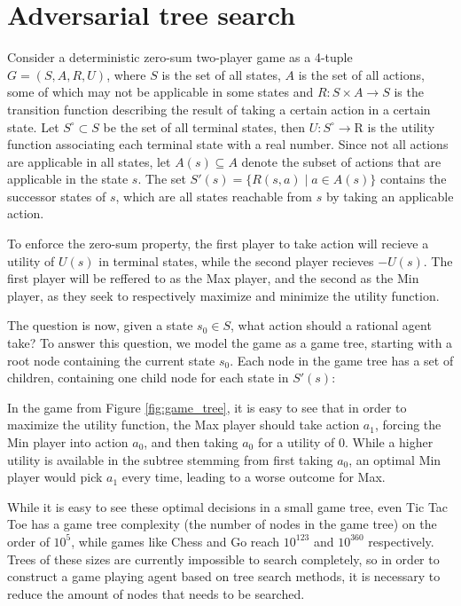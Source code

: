 \section{Adversarial tree search}
\label{sec:theory}

Consider a deterministic zero-sum two-player game as a 4-tuple 
$G = (S, A, R, U)$, where $S$ is the set of all states, $A$ is the
set of all actions, some of which may not be applicable in some
states and $R: S \times A \rightarrow S$ is the transition function
describing the result of taking a certain action in a certain state.
Let $S^\circ \subset S$ be the set of all terminal states, 
then $U: S^\circ \rightarrow \mathrm{R}$ is the utility function 
associating each terminal state with a real number. Since not all
actions are applicable in all states, let $A(s) \subseteq A$ denote
the subset of actions that are applicable in the state $s$. The set
$S'(s) = \{ R(s, a) \; | \; a \in A(s) \}$ contains the successor states of $s$,
which are all states reachable from $s$ by taking an applicable action.

To enforce the zero-sum property, the first player to take action will
recieve a utility of $U(s)$ in terminal states, while the second player
recieves $-U(s)$. The first player will be reffered to as the Max player,
and the second as the Min player, as they seek to respectively maximize 
and minimize the utility function.

The question is now, given a state $s_0 \in S$, what action should
a rational agent take? To answer this question, we model the game
as a game tree, starting with a root node containing the current state
$s_0$. Each node in the game tree has a set of children, containing 
one child node for each state in $S'(s)$:



In the game from Figure \ref{fig:game_tree}, it is easy to see that in
order to maximize the utility function, the Max player should take action
$a_1$, forcing the Min player into action $a_0$, and then taking $a_0$
for a utility of $0$. While a higher utility is available in the subtree
stemming from first taking $a_0$, an optimal Min player would pick $a_1$
every time, leading to a worse outcome for Max.

While it is easy to see these optimal decisions in a small game tree, even
Tic Tac Toe has a game tree complexity (the number of nodes in the game 
tree) on the order of $10^5$, while games like Chess and Go reach 
$10^{123}$ and $10^{360}$ respectively. Trees of these sizes are currently
impossible to search completely, so in order to construct a game playing
agent based on tree search methods, it is necessary to reduce the amount
of nodes that needs to be searched.

